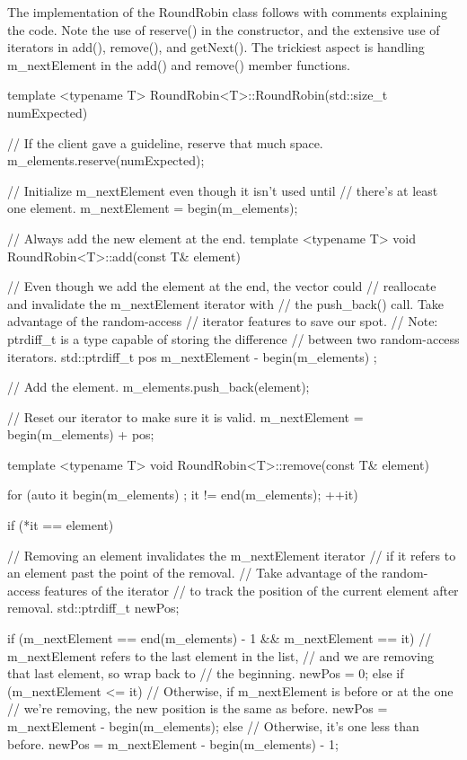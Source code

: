 The implementation of the RoundRobin class follows with comments explaining the code. Note the use of reserve() in the constructor, and the extensive use of iterators in add(), remove(), and getNext(). The trickiest aspect is handling m\_nextElement in the add() and remove() member functions.

\begin{cpp}
template <typename T> RoundRobin<T>::RoundRobin(std::size_t numExpected)
{
    // If the client gave a guideline, reserve that much space.
    m_elements.reserve(numExpected);

    // Initialize m_nextElement even though it isn't used until
    // there's at least one element.
    m_nextElement = begin(m_elements);
}

// Always add the new element at the end.
template <typename T> void RoundRobin<T>::add(const T& element)
{
    // Even though we add the element at the end, the vector could
    // reallocate and invalidate the m_nextElement iterator with
    // the push_back() call. Take advantage of the random-access
    // iterator features to save our spot.
    // Note: ptrdiff_t is a type capable of storing the difference
    //  between two random-access iterators.
    std::ptrdiff_t pos { m_nextElement - begin(m_elements) };

    // Add the element.
    m_elements.push_back(element);

    // Reset our iterator to make sure it is valid.
    m_nextElement = begin(m_elements) + pos;
}

template <typename T> void RoundRobin<T>::remove(const T& element)
{
    for (auto it { begin(m_elements) }; it != end(m_elements); ++it) {
        if (*it == element) {
            // Removing an element invalidates the m_nextElement iterator
            // if it refers to an element past the point of the removal.
            // Take advantage of the random-access features of the iterator
            // to track the position of the current element after removal.
            std::ptrdiff_t newPos;

            if (m_nextElement == end(m_elements) - 1 &&
                m_nextElement == it) {
                    // m_nextElement refers to the last element in the list,
                    // and we are removing that last element, so wrap back to
                    // the beginning.
                    newPos = 0;
                } else if (m_nextElement <= it) {
                    // Otherwise, if m_nextElement is before or at the one
                    // we're removing, the new position is the same as before.
                    newPos = m_nextElement - begin(m_elements);
                } else {
                    // Otherwise, it's one less than before.
                    newPos = m_nextElement - begin(m_elements) - 1;
                }

}}}
\end{cpp}
